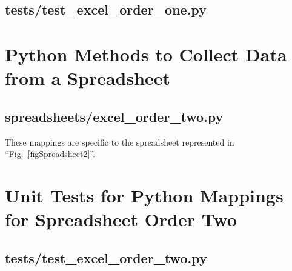 \documentclass[conference]{IEEEtran}
\begin{document}
    \newpage
    \subsection{tests/test\_excel\_order\_one.py}
    

% 
% 

\newpage
\section{Python Methods to Collect Data from a Spreadsheet} \label{appendixOrderTwo}
    \subsection{spreadsheets/excel\_order\_two.py}
    These mappings are specific to the spreadsheet represented in ``Fig.~\ref{figSpreadsheet2}''.
    

\newpage
\section{Unit Tests for Python Mappings for Spreadsheet Order Two} \label{appendixOrderTwoTests}
    \subsection{tests/test\_excel\_order\_two.py}
    
\end{document}
